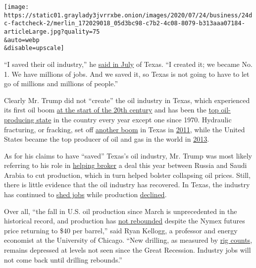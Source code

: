 \texttt{[image: https://static01.graylady3jvrrxbe.onion/images/2020/07/24/business/24dc-factcheck-2/merlin\_172029018\_05d3bc98-c7b2-4c08-8079-b313aaa07184-articleLarge.jpg?quality=75\\\&auto=webp\\\&disable=upscale]}

``I saved their oil industry,'' he
\href{https://www.whitehouse.gov/briefings-statements/remarks-president-trump-roundtable-stakeholders-positively-impacted-law-enforcement/}{said
in July} of Texas. ``I created it; we became No. 1. We have millions of
jobs. And we saved it, so Texas is not going to have to let go of
millions and millions of people.''

Clearly Mr. Trump did not ``create'' the oil industry in Texas, which
experienced its first oil boom
\href{https://www.thestoryoftexas.com/discover/campfire-stories/roughneck}{at
the start of the 20th century} and has been the
\href{https://www.eia.gov/todayinenergy/detail.php?id=38992}{top
oil-producing state} in the country every year except one since 1970.
Hydraulic fracturing, or fracking, set off
\href{https://www.nytimes3xbfgragh.onion/2011/05/28/business/energy-environment/28shale.html}{another
boom} in Texas in
\href{https://www.eia.gov/dnav/pet/hist/LeafHandler.ashx?n=PET\&s=MCRFPTX2\&f=M}{2011},
while the United States became the top producer of oil and gas in the
world in
\href{https://www.eia.gov/todayinenergy/detail.php?id=36292\&src=email}{2013}.

As for his claims to have ``saved'' Texas's oil industry, Mr. Trump was
most likely referring to his role in
\href{https://www.nytimes3xbfgragh.onion/2020/04/12/business/energy-environment/opec-russia-saudi-arabia-oil-coronavirus.html}{helping
broker} a deal this year between Russia and Saudi Arabia to cut
production, which in turn helped bolster collapsing oil prices. Still,
there is little evidence that the oil industry has recovered. In Texas,
the industry has continued to
\href{https://fred.stlouisfed.org/series/SMU48000001021100001}{shed
jobs} while production
\href{https://www.rrc.state.tx.us/oil-gas/research-and-statistics/production-data/texas-monthly-oil-gas-production/}{declined}.

Over all, ``the fall in U.S. oil production since March is unprecedented
in the historical record, and production has
\href{https://www.eia.gov/dnav/pet/hist/LeafHandler.ashx?n=PET\&s=WCRFPUS2\&f=W}{not
rebounded} despite the Nymex futures price returning to \$40 per
barrel,'' said Ryan Kellogg, a professor and energy economist at the
University of Chicago. ``New drilling, as measured by
\href{https://www.eia.gov/dnav/ng/hist/e_ertrro_xr0_nus_cm.htm}{rig
counts}, remains depressed at levels not seen since the Great Recession.
Industry jobs will not come back until drilling rebounds.''

